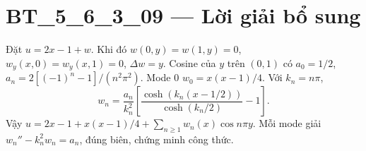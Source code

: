 \documentclass[10pt,a4paper]{article}
\begin{document}
\section*{BT\_5\_6\_3\_09 — Lời giải bổ sung}
Đặt $u=2x-1+w$. Khi đó $w(0,y)=w(1,y)=0$, $w_y(x,0)=w_y(x,1)=0$, $\Delta w=y$. Cosine của $y$ trên $(0,1)$ có $a_0=1/2$, $a_n=2[(-1)^n-1]/(n^2\pi^2)$. Mode 0 $w_0=x(x-1)/4$. Với $k_n=n\pi$,
\[w_n=\frac{a_n}{k_n^2}\left[\frac{\cosh(k_n(x-1/2))}{\cosh(k_n/2)}-1\right].\]
Vậy $u=2x-1+x(x-1)/4+\sum_{n\ge1}w_n(x)\cos n\pi y$. Mỗi mode giải $w_n''-k_n^2w_n=a_n$, đúng biên, chứng minh công thức.
\end{document}
